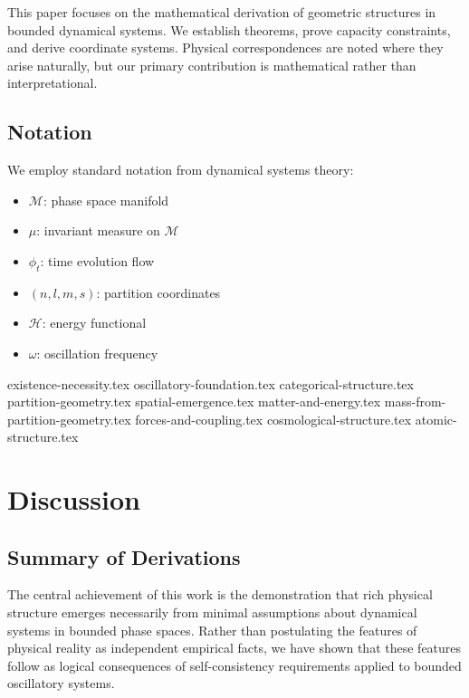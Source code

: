 \documentclass[11pt,a4paper]{article}
\theoremstyle{remark}
\begin{document}
This paper focuses on the mathematical derivation of geometric structures in bounded dynamical systems. We establish theorems, prove capacity constraints, and derive coordinate systems. Physical correspondences are noted where they arise naturally, but our primary contribution is mathematical rather than interpretational.

\subsection{Notation}

We employ standard notation from dynamical systems theory:
\begin{itemize}
    \item $\mathcal{M}$: phase space manifold
    \item $\mu$: invariant measure on $\mathcal{M}$
    \item $\phi_t$: time evolution flow
    \item $(n, l, m, s)$: partition coordinates
    \item $\mathcal{H}$: energy functional
    \item $\omega$: oscillation frequency
\end{itemize}

{existence-necessity.tex}
{oscillatory-foundation.tex}
{categorical-structure.tex}
{partition-geometry.tex}
{spatial-emergence.tex}
{matter-and-energy.tex}
{mass-from-partition-geometry.tex}
{forces-and-coupling.tex}
{cosmological-structure.tex}
{atomic-structure.tex}


\section{Discussion}

\subsection{Summary of Derivations}

The central achievement of this work is the demonstration that rich physical structure emerges necessarily from minimal assumptions about dynamical systems in bounded phase spaces. Rather than postulating the features of physical reality as independent empirical facts, we have shown that these features follow as logical consequences of self-consistency requirements applied to bounded oscillatory systems.
\end{document}

